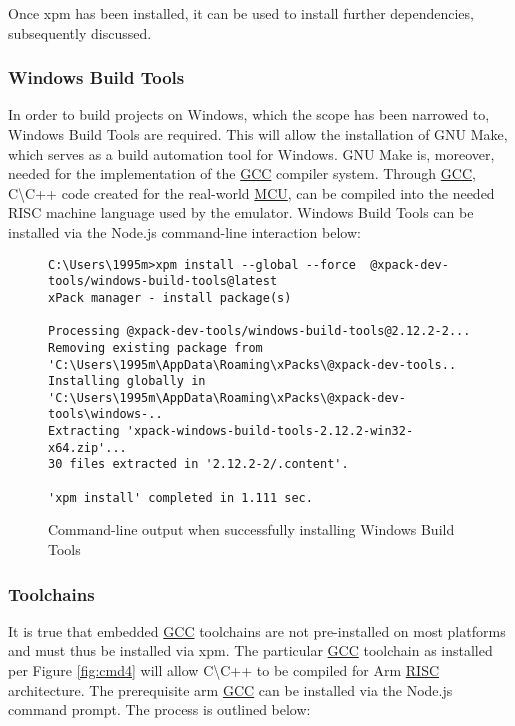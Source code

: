 Once xpm has been installed, it can be used to install further dependencies, subsequently discussed.

\subsubsection{Windows Build Tools}
\label{make}
In order to build projects on Windows, which the scope has been narrowed to, Windows Build Tools are required. This will allow the installation of GNU Make, which serves as a build automation tool for Windows. GNU Make is, moreover, needed for the implementation of the \hyperref[listAbr]{GCC} compiler system. Through \hyperref[listAbr]{GCC}, C\textbackslash C++ code created for the real-world \hyperref[listAbr]{MCU}, can be compiled into the needed RISC machine language used by the emulator. Windows Build Tools can be installed via the Node.js command-line interaction below:



\begin{figure}[H]
\begin{center}
\begin{lstlisting}[style=DOS]
C:\Users\1995m>xpm install --global --force  @xpack-dev-tools/windows-build-tools@latest
xPack manager - install package(s)

Processing @xpack-dev-tools/windows-build-tools@2.12.2-2...
Removing existing package from 'C:\Users\1995m\AppData\Roaming\xPacks\@xpack-dev-tools..
Installing globally in 'C:\Users\1995m\AppData\Roaming\xPacks\@xpack-dev-tools\windows-..
Extracting 'xpack-windows-build-tools-2.12.2-win32-x64.zip'...
30 files extracted in '2.12.2-2/.content'.

'xpm install' completed in 1.111 sec.
\end{lstlisting}
\caption{Command-line output when successfully installing Windows Build Tools}
\label{fig:cmd3}
\end{center}
\end{figure}

\subsubsection{Toolchains}
\label{toolchains}
It is true that embedded \hyperref[listAbr]{GCC} toolchains are not pre-installed on most platforms and must thus be installed via xpm. The particular \hyperref[listAbr]{GCC} toolchain as installed per Figure \ref{fig:cmd4} will allow C\textbackslash C++ to be compiled for Arm \hyperref[listAbr]{RISC} architecture. The prerequisite arm \hyperref[listAbr]{GCC} can be installed via the Node.js command prompt. The process is outlined below:

